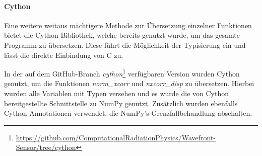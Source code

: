 \paragraph{Cython}

Eine weitere weitaus mächtigere Methode zur Übersetzung einzelner Funktionen bietet die Cython-Bibliothek, welche bereits genutzt wurde, um das gesamte Programm zu übersetzen. Diese führt die Möglichkeit der Typisierung ein und lässt die direkte Einbindung von C zu. 

In der auf dem GitHub-Branch \textit{cython}\footnote{\url{https://github.com/ComputationalRadiationPhysics/Wavefront-Sensor/tree/cython}} verfügbaren Version wurden Cython genutzt, um die Funktionen \textit{norm\_xcorr} und \textit{nxcorr\_disp} zu übersetzen. Hierbei wurden alle Variablen mit Typen versehen und es wurde die von Cython bereitgestellte Schnittstelle zu NumPy genutzt. Zusätzlich wurden ebenfalls Cython-Annotationen verwendet, die NumPy's Grenzfallbehandlung abschalten. 